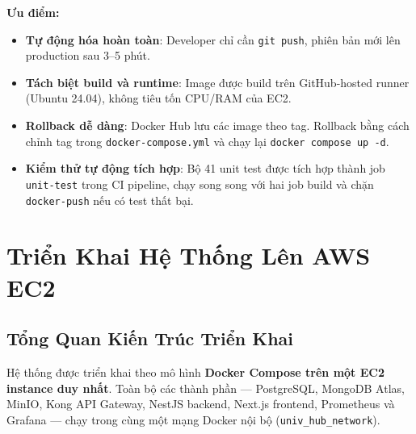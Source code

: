 \textbf{Ưu điểm:}
\begin{itemize}
  \item \textbf{Tự động hóa hoàn toàn}: Developer chỉ cần \texttt{git push},
        phiên bản mới lên production sau 3--5 phút.
  \item \textbf{Tách biệt build và runtime}: Image được build trên
        GitHub-hosted runner (Ubuntu 24.04), không tiêu tốn CPU/RAM của EC2.
  \item \textbf{Rollback dễ dàng}: Docker Hub lưu các image theo tag.
        Rollback bằng cách chỉnh tag trong \texttt{docker-compose.yml}
        và chạy lại \texttt{docker compose up -d}.
  \item \textbf{Kiểm thử tự động tích hợp}: Bộ 41 unit test được tích hợp thành
        job \texttt{unit-test} trong CI pipeline, chạy song song với hai job build
        và chặn \texttt{docker-push} nếu có test thất bại.
\end{itemize}



\newpage
\section{Triển Khai Hệ Thống Lên AWS EC2}

\subsection{Tổng Quan Kiến Trúc Triển Khai}

Hệ thống được triển khai theo mô hình \textbf{Docker Compose trên một EC2
instance duy nhất}. Toàn bộ các thành phần — PostgreSQL, MongoDB Atlas,
MinIO, Kong API Gateway, NestJS backend, Next.js frontend, Prometheus và
Grafana — chạy trong cùng một mạng Docker nội bộ (\texttt{univ\_hub\_network}).

